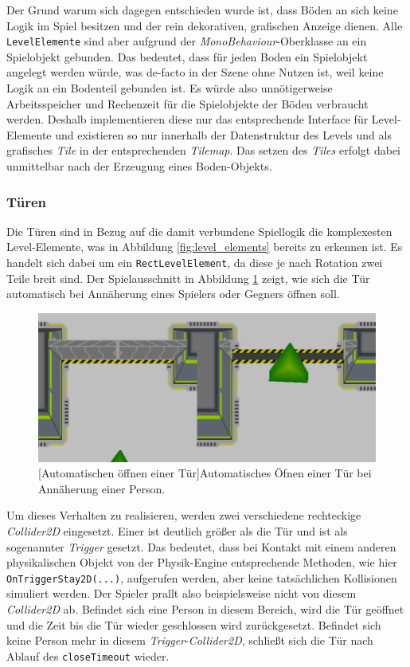 Der Grund warum sich dagegen entschieden wurde ist, dass Böden an sich keine Logik im Spiel besitzen und der rein dekorativen, grafischen Anzeige dienen. Alle \texttt{LevelElemente} sind aber aufgrund der \textit{MonoBehaviour}-Oberklasse an ein Spielobjekt gebunden. Das bedeutet, dass für jeden Boden ein Spielobjekt angelegt werden würde, was de-facto in der Szene ohne Nutzen ist, weil keine Logik an ein Bodenteil gebunden ist. Es würde also unnötigerweise Arbeitsspeicher und Rechenzeit für die Spielobjekte der Böden verbraucht werden. Deshalb implementieren diese nur das entsprechende Interface für Level-Elemente und existieren so nur innerhalb der Datenstruktur des Levels und als grafisches \textit{Tile} in der entsprechenden \textit{Tilemap}. Das setzen des \textit{Tiles} erfolgt dabei unmittelbar nach der Erzeugung eines Boden-Objekts.

\subsubsection{Türen}\label{sec:door}
Die Türen sind in Bezug auf die damit verbundene Spiellogik die komplexesten Level-Elemente, was in Abbildung \ref{fig:level_elements} bereits zu erkennen ist. Es handelt sich dabei um ein \texttt{RectLevelElement}, da diese je nach Rotation zwei Teile breit sind. Der Spielausschnitt in Abbildung \ref{fig:door_opening} zeigt, wie sich die Tür automatisch bei Annäherung eines Spielers oder Gegners öffnen soll.

\begin{figure}[h]
 \centering
 \includegraphics[width=0.6\linewidth]{pics/traversing_door.png}
 [Automatischen öffnen einer Tür]{Automatisches Öfnen einer Tür bei Annäherung einer Person.}
	\label{fig:door_opening}
\end{figure}

Um dieses Verhalten zu realisieren, werden zwei verschiedene rechteckige \textit{Collider2D} eingesetzt. Einer ist deutlich größer als die Tür und ist als sogenannter \textit{Trigger} gesetzt. Das bedeutet, dass bei Kontakt mit einem anderen physikalischen Objekt von der Physik-Engine entsprechende Methoden, wie hier \texttt{OnTriggerStay2D(...)}, aufgerufen werden, aber keine tatsächlichen Kollisionen simuliert werden. Der Spieler prallt also beispielsweise nicht von diesem \textit{Collider2D} ab. Befindet sich eine Person in diesem Bereich, wird die Tür geöffnet und die Zeit bis die Tür wieder geschlossen wird zurückgesetzt. Befindet sich keine Person mehr in diesem \textit{Trigger}-\textit{Collider2D}, schließt sich die Tür nach Ablauf des \texttt{closeTimeout} wieder.

